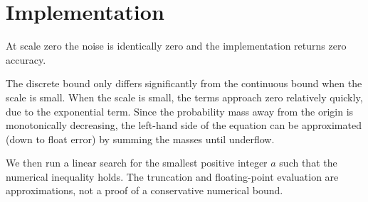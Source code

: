 \documentclass{article}
\begin{document}
\section{Implementation}

At scale zero the noise is identically zero and the implementation returns zero accuracy.

The discrete bound only differs significantly from the continuous bound when the scale is small.
When the scale is small, the terms approach zero relatively quickly, due to the exponential term.
Since the probability mass away from the origin is monotonically decreasing,
the left-hand side of the equation can be approximated (down to float error) by summing the masses until underflow.

We then run a linear search for the smallest positive integer $a$ such that the numerical inequality holds. The truncation and floating-point evaluation are approximations, not a proof of a conservative numerical bound.
\end{document}
